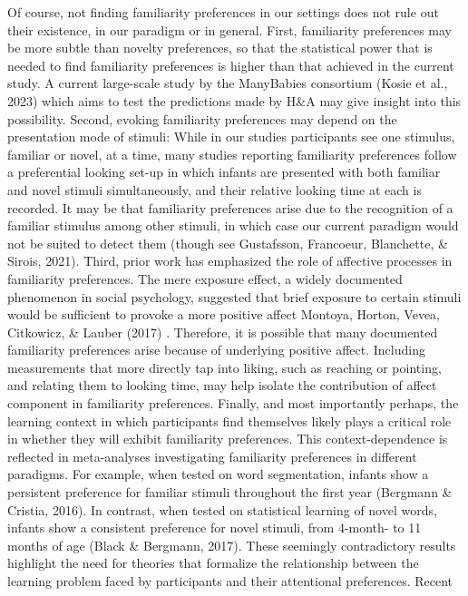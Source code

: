 \documentclass[10pt, letterpaper]{article}
\begin{document}
Of course, not finding familiarity preferences in our settings does not
rule out their existence, in our paradigm or in general. First,
familiarity preferences may be more subtle than novelty preferences, so
that the statistical power that is needed to find familiarity
preferences is higher than that achieved in the current study. A current
large-scale study by the ManyBabies consortium (Kosie et al., 2023)
which aims to test the predictions made by H\&A may give insight into
this possibility. Second, evoking familiarity preferences may depend on
the presentation mode of stimuli: While in our studies participants see
one stimulus, familiar or novel, at a time, many studies reporting
familiarity preferences follow a preferential looking set-up in which
infants are presented with both familiar and novel stimuli
simultaneously, and their relative looking time at each is recorded. It
may be that familiarity preferences arise due to the recognition of a
familiar stimulus among other stimuli, in which case our current
paradigm would not be suited to detect them (though see Gustafsson,
Francoeur, Blanchette, \& Sirois, 2021). Third, prior work has
emphasized the role of affective processes in familiarity preferences.
The mere exposure effect, a widely documented phenomenon in social
psychology, suggested that brief exposure to certain stimuli would be
sufficient to provoke a more positive affect Montoya, Horton, Vevea,
Citkowicz, \& Lauber (2017) . Therefore, it is possible that many
documented familiarity preferences arise because of underlying positive
affect. Including measurements that more directly tap into liking, such
as reaching or pointing, and relating them to looking time, may help
isolate the contribution of affect component in familiarity preferences.
Finally, and most importantly perhaps, the learning context in which
participants find themselves likely plays a critical role in whether
they will exhibit familiarity preferences. This context-dependence is
reflected in meta-analyses investigating familiarity preferences in
different paradigms. For example, when tested on word segmentation,
infants show a persistent preference for familiar stimuli throughout the
first year (Bergmann \& Cristia, 2016). In contrast, when tested on
statistical learning of novel words, infants show a consistent
preference for novel stimuli, from 4-month- to 11 months of age (Black
\& Bergmann, 2017). These seemingly contradictory results highlight the
need for theories that formalize the relationship between the learning
problem faced by participants and their attentional preferences. Recent
\end{document}
